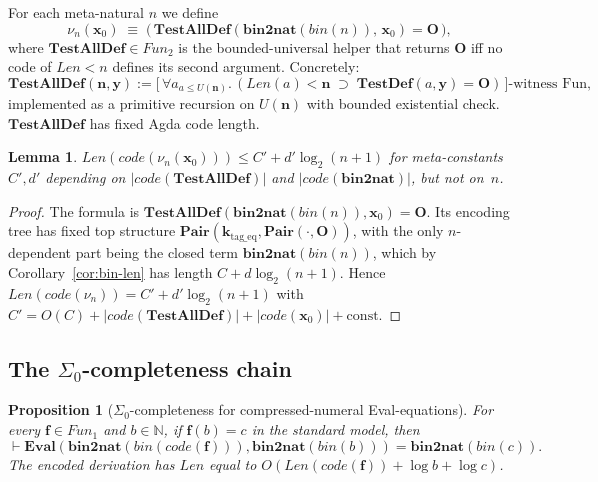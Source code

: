 \documentclass[11pt]{article}
\theoremstyle{plain}
\newtheorem{lemma}[theorem]{Lemma}
\newtheorem{proposition}[theorem]{Proposition}
\theoremstyle{definition}
\theoremstyle{remark}
\newcommand{\code}[1]{\mathit{code}(#1)}
\newcommand{\Pair}{\mathbf{Pair}}
\newcommand{\Fun}{\mathit{Fun}}
\newcommand{\Len}{\mathit{Len}}
\newcommand{\Eval}{\mathbf{Eval}}
\newcommand{\bnt}{\mathbf{bin2nat}}
\newcommand{\bin}{\mathit{bin}}
\begin{document}
For each meta-natural $n$ we define
$$
\nu_n(\mathbf{x}_0) \;\equiv\; \bigl(\, \mathbf{TestAllDef}(\bnt(\bin(n)),\, \mathbf{x}_0) = \mathbf{O} \,\bigr),
$$
where $\mathbf{TestAllDef} \in \Fun_2$ is the bounded-universal
helper that returns $\mathbf{O}$ iff no code of $\Len < n$ defines its
second argument.  Concretely:
$$
\mathbf{TestAllDef}(\mathbf{n}, \mathbf{y}) := \bigl[\,\forall a_{a \leq U(\mathbf{n})}.\,(\Len(a) < \mathbf{n} \;\supset\; \mathbf{TestDef}(a, \mathbf{y}) = \mathbf{O})\,\bigr]\text{-witness Fun},
$$
implemented as a primitive recursion on $U(\mathbf{n})$ with bounded
existential check.  $\mathbf{TestAllDef}$ has fixed Agda code length.

\begin{lemma}\label{lem:nu-length}
$\Len(\code{\nu_n(\mathbf{x}_0)}) \leq C' + d' \log_2(n + 1)$ for
meta-constants $C', d'$ depending on $|\code{\mathbf{TestAllDef}}|$ and
$|\code{\bnt}|$, but not on~$n$.
\end{lemma}

\begin{proof}
The formula is $\mathbf{TestAllDef}(\bnt(\bin(n)), \mathbf{x}_0) =
\mathbf{O}$.  Its encoding tree has fixed top structure
$\Pair(\mathbf{k}_{\mathrm{tag\_eq}}, \Pair(\cdot, \mathbf{O}))$, with
the only $n$-dependent part being the closed term
$\bnt(\bin(n))$, which by Corollary~\ref{cor:bin-len} has length $C +
d \log_2(n + 1)$.  Hence
$\Len(\code{\nu_n}) = C' + d' \log_2(n+1)$ with $C' = O(C) + |\code{\mathbf{TestAllDef}}|
+ |\code{\mathbf{x}_0}| + \mathrm{const}$.
\end{proof}

\subsection{The $\Sigma_0$-completeness chain}
\label{sec:sigma0}

\begin{proposition}[$\Sigma_0$-completeness for compressed-numeral Eval-equations]\label{prop:sound}
For every $\mathbf{f} \in \Fun_1$ and $b \in \mathbb{N}$, if
$\mathbf{f}(b) = c$ in the standard model, then
$$
\vdash \Eval(\bnt(\bin(\code{\mathbf{f}})), \bnt(\bin(b))) = \bnt(\bin(c)).
$$
The encoded derivation has $\Len$ equal to $O(\Len(\code{\mathbf{f}})
+ \log b + \log c)$.
\end{proposition}
\end{document}
